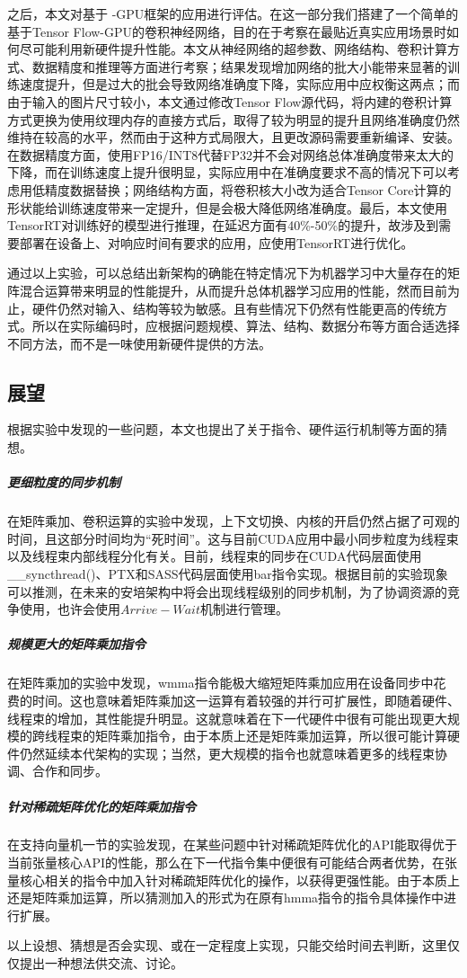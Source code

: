 \par 之后，本文对基于 -GPU框架的应用进行评估。在这一部分我们搭建了一个简单的基于Tensor Flow-GPU的卷积神经网络，目的在于考察在最贴近真实应用场景时如何尽可能利用新硬件提升性能。本文从神经网络的超参数、网络结构、卷积计算方式、数据精度和推理等方面进行考察；结果发现增加网络的批大小能带来显著的训练速度提升，但是过大的批会导致网络准确度下降，实际应用中应权衡这两点；而由于输入的图片尺寸较小，本文通过修改Tensor Flow源代码，将内建的卷积计算方式更换为使用纹理内存的直接方式后，取得了较为明显的提升且网络准确度仍然维持在较高的水平，然而由于这种方式局限大，且更改源码需要重新编译、安装。在数据精度方面，使用FP16/INT8代替FP32并不会对网络总体准确度带来太大的下降，而在训练速度上提升很明显，实际应用中在准确度要求不高的情况下可以考虑用低精度数据替换；网络结构方面，将卷积核大小改为适合Tensor Core计算的形状能给训练速度带来一定提升，但是会极大降低网络准确度。最后，本文使用TensorRT对训练好的模型进行推理，在延迟方面有40\%-50\%的提升，故涉及到需要部署在设备上、对响应时间有要求的应用，应使用TensorRT进行优化。
\par 通过以上实验，可以总结出新架构的确能在特定情况下为机器学习中大量存在的矩阵混合运算带来明显的性能提升，从而提升总体机器学习应用的性能，然而目前为止，硬件仍然对输入、结构等较为敏感。且有些情况下仍然有性能更高的传统方式。所以在实际编码时，应根据问题规模、算法、结构、数据分布等方面合适选择不同方法，而不是一味使用新硬件提供的方法。
\subsection{展望}
\par 根据实验中发现的一些问题，本文也提出了关于指令、硬件运行机制等方面的猜想。
\subparagraph{更细粒度的同步机制}
\par 在矩阵乘加、卷积运算的实验中发现，上下文切换、内核的开启仍然占据了可观的时间，且这部分时间均为“死时间”。这与目前CUDA应用中最小同步粒度为线程束以及线程束内部线程分化有关。目前，线程束的同步在CUDA代码层面使用\_\_syncthread()、PTX和SASS代码层面使用bar指令实现。根据目前的实验现象可以推测，在未来的安培架构中将会出现线程级别的同步机制，为了协调资源的竞争使用，也许会使用$ Arrive-Wait $机制进行管理。
\subparagraph{规模更大的矩阵乘加指令}
\par 在矩阵乘加的实验中发现，wmma指令能极大缩短矩阵乘加应用在设备同步中花 费的时间。这也意味着矩阵乘加这一运算有着较强的并行可扩展性，即随着硬件、线程束的增加，其性能提升明显\cite{SCALABLITY}。这就意味着在下一代硬件中很有可能出现更大规模的跨线程束的矩阵乘加指令，由于本质上还是矩阵乘加运算，所以很可能计算硬件仍然延续本代架构的实现；当然，更大规模的指令也就意味着更多的线程束协调、合作和同步。
\subparagraph{针对稀疏矩阵优化的矩阵乘加指令}
\par 在支持向量机一节的实验发现，在某些问题中针对稀疏矩阵优化的API能取得优于当前张量核心API的性能，那么在下一代指令集中便很有可能结合两者优势，在张量核心相关的指令中加入针对稀疏矩阵优化的操作，以获得更强性能。由于本质上还是矩阵乘加运算，所以猜测加入的形式为在原有hmma指令的指令具体操作中进行扩展。
\par 以上设想、猜想是否会实现、或在一定程度上实现，只能交给时间去判断，这里仅仅提出一种想法供交流、讨论。
